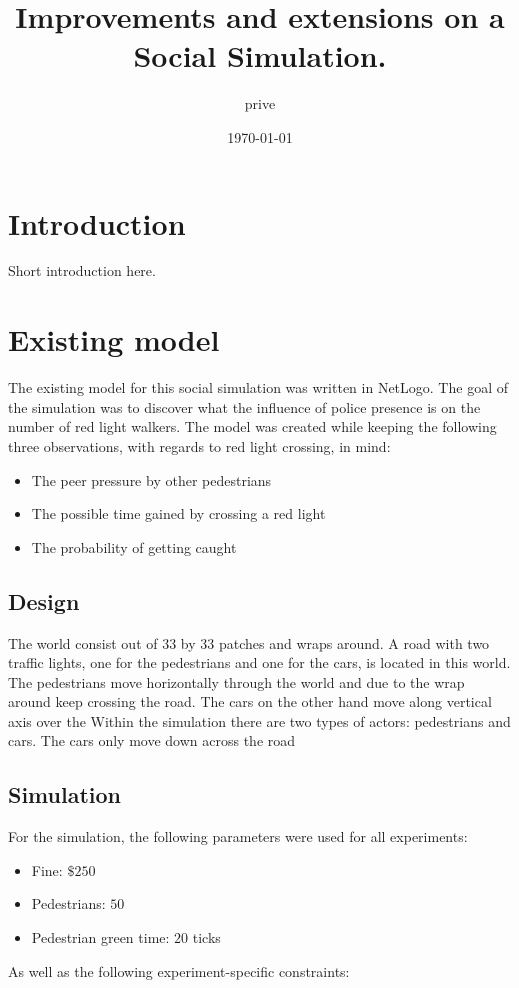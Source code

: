 \documentclass[a4paper]{article}
\title{Improvements and extensions on a Social Simulation.}
\author{prive}
\date{\today}
\begin{document}
\maketitle
\clearpage
\tableofcontents
\clearpage

\section{Introduction}
Short introduction here.

\clearpage

\section{Existing model}
The existing model for this social simulation was written in NetLogo. The goal of the simulation was to discover what the influence of police presence is on the number of red light walkers. The model was created while keeping the following three observations, with regards to red light crossing, in mind:
\begin{itemize}
\item The peer pressure by other pedestrians
\item The possible time gained by crossing a red light
\item The probability of getting caught
\end{itemize}

\subsection{Design}
The world consist out of 33 by 33 patches and wraps around. A road with two traffic lights, one for the pedestrians and one for the cars, is located in this world. The pedestrians move horizontally through the world and due to the wrap around keep crossing the road. The cars on the other hand move along vertical axis over the Within the simulation there are two types of actors: pedestrians and cars. The cars only move down across the road 

\subsection{Simulation}
\label{sec:initialsim}
For the simulation, the following parameters were used for all experiments:
\begin{itemize}
\item Fine: $\$250$
\item Pedestrians: $50$
\item Pedestrian green time: $20$ ticks
\end{itemize}
As well as the following experiment-specific constraints:\\
\end{document}

